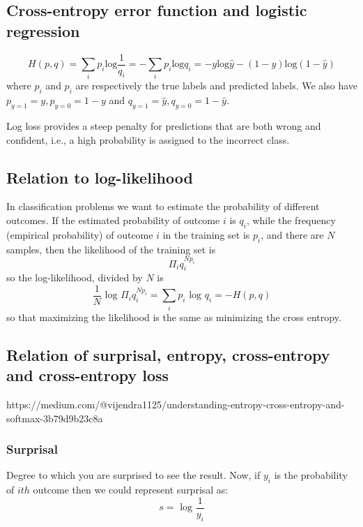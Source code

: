 \documentclass[11pt]{article}
\begin{document}
    \subsection{Cross-entropy error function and logistic
regression}\label{cross-entropy-error-function-and-logistic-regression}

\[ H(p,q) = \sum_i p_i \text{log}\frac{1}{q_i} = -\sum_i p_i \text{log}q_i = -y\text{log}\hat{y} - (1-y)\text{log}(1-\hat{y})\]
where \(p_i\) and \(p_i\) are respectively the true labels and predicted
labels. We also have \(p_{y=1} = y, p_{y=0} = 1-y\) and
\(q_{y=1} = \hat{y}, q_{y=0} = 1-\hat{y}\).

Log loss provides a steep penalty for predictions that are both wrong
and confident, i.e., a high probability is assigned to the incorrect
class.

    \subsection{Relation to
log-likelihood}\label{relation-to-log-likelihood}

In classification problems we want to estimate the probability of
different outcomes. If the estimated probability of outcome \(i\) is
\(q_i\), while the frequency (empirical probability) of outcome \(i\) in
the training set is \(p_i\), and there are \(N\) samples, then the
likelihood of the training set is \[\Pi_i q_i^{Np_i}\] so the
log-likelihood, divided by \(N\) is
\[ \frac{1}{N}\text{ log }\Pi_i q_i^{Np_i} = \sum_i p_i \text{ log }q_i = -H(p,q)\]
so that maximizing the likelihood is the same as minimizing the cross
entropy.

    \subsection{Relation of surprisal, entropy, cross-entropy and
cross-entropy
loss}\label{relation-of-surprisal-entropy-cross-entropy-and-cross-entropy-loss}

https://medium.com/@vijendra1125/understanding-entropy-cross-entropy-and-softmax-3b79d9b23c8a

\subsubsection{Surprisal}\label{surprisal}

Degree to which you are surprised to see the result. Now, if \(y_i\) is
the probability of \(ith\) outcome then we could represent surprisal as:
\[s = \text{ log } \frac{1}{y_i}\]
\end{document}
